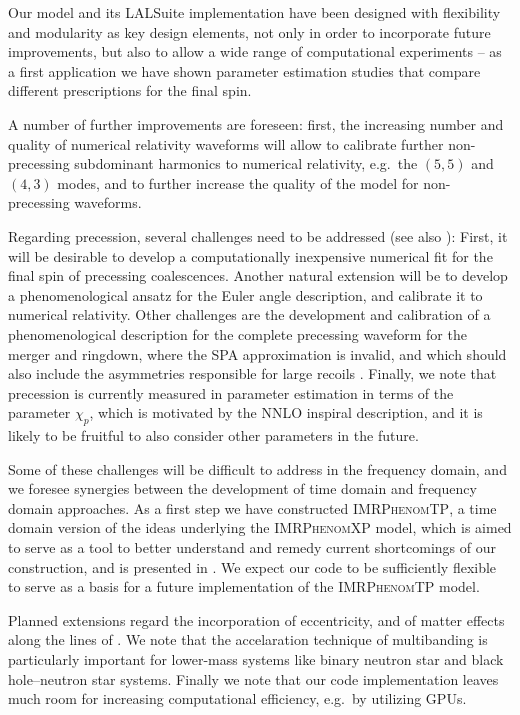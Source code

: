 \documentclass[%
aps,
prd,
amssymb,
amsmath,
amsfonts,
eqsecnum,
showpacs,
nofootinbib,
floatfix,
twocolumn,
twoside,
a4paper,
superscriptaddress
]{revtex4-1}
\newcommand{\phXP}{\textsc{IMRPhenomXP}\xspace}
\newcommand{\phT}{\textsc{IMRPhenomTP}\xspace}
\newcommand{\phTP}{\textsc{IMRPhenomTP}\xspace}
\begin{document}
Our model and its LALSuite implementation have been designed with flexibility and modularity as key design elements, not only in order to incorporate future improvements, but also to allow a wide range of computational experiments -- as a first application we have shown parameter estimation studies that compare different prescriptions for the final spin.

A number of further improvements are foreseen: first, the increasing number and quality of numerical relativity waveforms will allow to calibrate further non-precessing subdominant harmonics to numerical relativity, e.g.~the $(5,5)$ and $(4,3)$ modes, and to further increase the quality of the model for non-precessing waveforms.

Regarding precession, several challenges need to be addressed (see also \cite{Ramos-Buades:2020noq}): First, it will be desirable to develop a computationally inexpensive numerical fit for the final spin of precessing coalescences. Another natural extension will be to develop a phenomenological ansatz for the Euler angle description, and calibrate it to numerical relativity. Other challenges are the development and calibration of a
phenomenological description for the complete precessing waveform for the merger and ringdown, where the SPA approximation is invalid, and which should also include the asymmetries responsible for large recoils \cite{Brugmann:2007zj}. Finally, we note that precession is currently measured in parameter estimation in terms of the parameter $\chi_p$, which is motivated by the NNLO inspiral description, and it is likely to be fruitful to also consider other parameters in the future.

Some of these challenges will be difficult to address in the frequency domain, and we foresee
synergies between the development of time domain and frequency domain approaches. As a first step we have constructed \phTP, a time domain version of the ideas underlying the \phXP model, which is aimed to serve as a tool to better understand and remedy current shortcomings of our construction, and is presented in \cite{phenT}.
We expect our code to be sufficiently flexible to serve as a basis for a future implementation of the \phT model.

Planned extensions regard the incorporation of eccentricity, and of matter effects along the lines of \cite{Dietrich:2017aum,Dietrich:2019kaq,Thompson:2020nei}. We note that the accelaration technique of multibanding is particularly important for lower-mass systems like binary neutron star and black hole--neutron star systems.
Finally we note that our code implementation leaves much room for increasing computational efficiency, e.g.~by utilizing GPUs.
\end{document}
